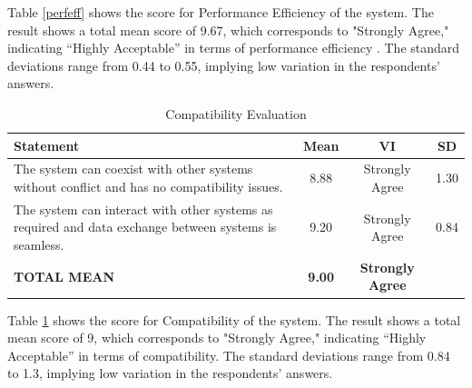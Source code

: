 	Table \ref{perfeff} shows the score for Performance Efficiency of the system. The result shows a total mean score of 9.67, which corresponds to "Strongly Agree," indicating “Highly Acceptable” in terms of performance efficiency . The standard deviations range from 0.44 to 0.55, implying low variation in the respondents’ answers.
	
	\begin{table}[h!]
		\centering
		\caption{Compatibility Evaluation}
		\label{comptbl}
		\renewcommand{\arraystretch}{1.2}
		\begin{tabularx}{\linewidth}{|X|c|c|c|}
			\hline
			\textbf{Statement} & \textbf{Mean} & \textbf{VI} & \textbf{SD} \\ \hline
			The system can coexist with other systems without conflict and has no compatibility issues.
			& 8.88 & Strongly Agree & 1.30 \\ \hline
			The system can interact with other systems as required and data exchange between systems is seamless.
			& 9.20 & Strongly Agree & 0.84 \\ \hline
			\textbf{TOTAL MEAN} & \textbf{9.00} & \textbf{Strongly Agree} & \\ \hline
		\end{tabularx}
	\end{table}
	
	Table \ref{comptbl} shows the score for Compatibility of the system. The result shows a total mean score of 9, which corresponds to "Strongly Agree," indicating “Highly Acceptable” in terms of compatibility. The standard deviations range from 0.84 to 1.3, implying low variation in the respondents’ answers.
	
